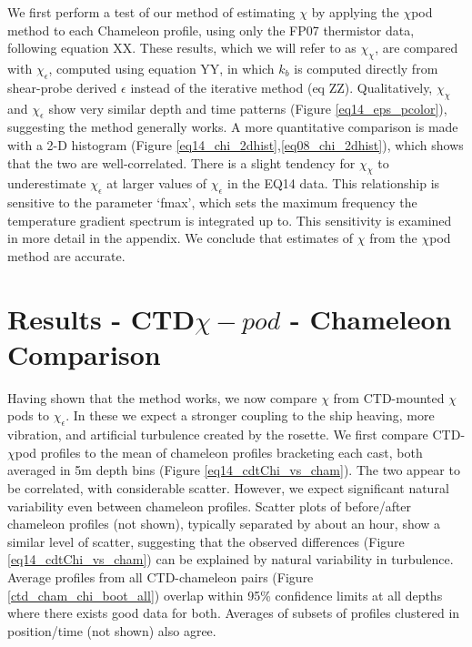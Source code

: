 \documentclass{ametsoc}
\begin{document}
We first perform a test of our method of estimating $\chi$ by applying the $\chi$pod method to each Chameleon profile, using only the FP07 thermistor data, following equation XX. These results, which we will refer to as $\chi_{\chi}$, are compared with $\chi_{\epsilon}$, computed using equation YY, in which $k_b$ is computed directly from shear-probe derived $\epsilon$ instead of the iterative method (eq ZZ).   Qualitatively, $\chi_{\chi}$ and $\chi_{\epsilon}$ show very similar depth and time patterns (Figure \ref{eq14_eps_pcolor}), suggesting the method generally works. A more quantitative comparison is made with a 2-D histogram (Figure \ref{eq14_chi_2dhist},\ref{eq08_chi_2dhist}), which shows that the two are well-correlated. There is a slight tendency for $\chi_{\chi}$ to underestimate $\chi_{\epsilon}$ at larger values of $\chi_{\epsilon}$ in the EQ14 data. This relationship is sensitive to the parameter `fmax', which sets the maximum frequency the temperature gradient spectrum is integrated up to. This sensitivity is examined in more detail in the appendix. We conclude that estimates of $\chi$ from the $\chi$pod method are accurate.






\section{Results -  CTD$\chi -pod$ - Chameleon Comparison}

Having shown that the method works, we now compare $\chi$ from CTD-mounted $\chi$pods to $\chi_{\epsilon}$. In these we expect a stronger coupling to the ship heaving, more vibration, and artificial turbulence created by the rosette. We first compare CTD-$\chi$pod profiles to the mean of chameleon profiles bracketing each cast, both averaged in 5m depth bins (Figure \ref{eq14_cdtChi_vs_cham}). The two appear to be correlated, with considerable scatter. However, we expect significant natural variability even between chameleon profiles. Scatter plots of before/after chameleon profiles (not shown), typically separated by about an hour, show a similar level of scatter, suggesting that the observed differences (Figure \ref{eq14_cdtChi_vs_cham}) can be explained by natural variability in turbulence. Average profiles from all CTD-chameleon pairs (Figure \ref{ctd_cham_chi_boot_all}) overlap within 95\% confidence limits at all depths where there exists good data for both. Averages of subsets of profiles clustered in position/time (not shown) also agree. 
\end{document}
